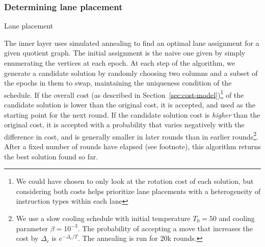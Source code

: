 \subsubsection*{Determining lane placement}
\begin{algorithm}
    

    \caption{Lane placement}\label{alg:lane-placement}
    
\end{algorithm}
The inner layer uses simulated annealing to find an optimal lane assignment for a given quotient graph.
The initial assignment is the naive one given by simply enumerating the vertices at each epoch.
At each step of the algorithm, we generate a candidate solution by randomly choosing two columns and a subset of the epochs in them to swap, maintaining the uniqueness condition of the schedule.
If the overall cost (as described in Section~\ref{sec:cost-model})\footnote{We could have chosen to only look at the rotation cost of each solution, but considering both costs helps prioritize lane placements with a heterogeneity of instruction types within each lane} of the candidate solution is lower than the original cost, it is accepted, and used as the starting point for the next round.
If the candidate solution cost is {\em higher} than the original cost, it is accepted with a probability that varies negatively with the difference in cost, and is generally smaller in later rounds than in earlier rounds\footnote{We use a slow cooling schedule with initial temperature $T_0=50$ and cooling parameter $\beta=10^{-3}$. The probability of accepting a move that increases the cost by $\Delta_c$ is $e^{-\Delta_c/T}$. The annealing is run for $20$k rounds.}.
After a fixed number of rounds have elapsed (see footnote), this algorithm returns the best solution found so far.

